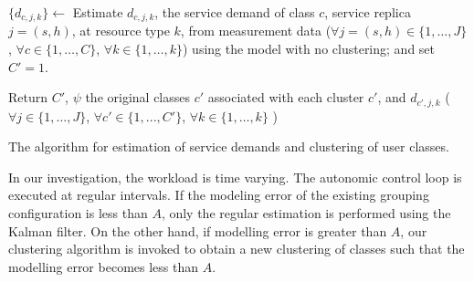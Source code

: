 \begin{algorithm}
	\small
	\SetAlgoVlined
       \SetAlFnt{\tiny}



\BlankLine
$\{d_{c,j,k}\} \gets$ Estimate $d_{c,j,k}$, the service demand of class $c$, service replica $j=(s,h)$, at resource type $k$, from measurement data ($\forall j=(s,h)\in\{1, \dots,J\}$, $\forall c\in\{1, \dots,C\}$, $\forall k\in\{1, \dots,k\}$) using the model with no clustering; and set $C' = 1$.
\BlankLine 

Return $C'$, $\psi$ the original classes $c'$ associated with each cluster $c'$, and
$d_{c',j,k}$ ($\forall j\in\{1,\dots,J\}$, $\forall c'\in\{1,...,C'\}$, $\forall k\in\{1, \dots,k\}$ ) 
\BlankLine

\caption[The algorithm for estimation of service demands and clustering of user classes.]{The algorithm for estimation of service demands and clustering of user classes.}
\label{algorithm-estimation}
\end{algorithm}

In our investigation, the workload is time varying. The autonomic control loop is executed at regular intervals. If the modeling error of the existing grouping configuration is less than $A$, only the regular estimation is performed using the Kalman filter. On the other hand, if modelling error is greater than $A$, our clustering algorithm is invoked to obtain a new clustering of classes such that the modelling error becomes less than $A$.     

